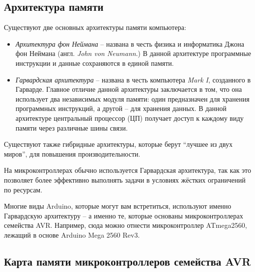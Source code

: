 \documentclass[../sparc.tex]{subfiles}
\begin{document}
\subsection{Архитектура памяти}

Существуют две основных архитектуры памяти компьютера:
\begin{itemize}
\item \emph{Архитектура фон Неймана} -- названа в честь физика и информатика
  Джона фон Неймана (англ. \textit{John von Neumann}.)  В данной архитектуре
  программные инструкции и данные сохраняются в единой памяти.
\item \emph{Гарвардская архитектура} -- названа в честь компьютера \emph{Mark I},
  созданного в Гарварде.  Главное отличие данной архитектуры заключается в том,
  что она использует два независимых модуля памяти: один предназначен для
  хранения программных инструкций, а другой -- для хранения данных.  В данной
  архитектуре центральный процессор (ЦП) получает доступ к каждому виду памяти
  через различные шины связи.
\end{itemize}

Существуют также гибридные архитектуры, которые берут ``лучшее из двух миров'',
для повышения производительности.

На микроконтроллерах обычно используется Гарвардская архитектура, так как это
позволяет более эффективно выполнять задачи в условиях жёстких ограничений по
ресурсам.

Многие виды Arduino, которые могут вам встретиться, используют именно
Гарвардскую архитектуру -- а именно те, которые основаны микроконтроллерах
семейства AVR.  Например, сюда можно отнести микроконтроллер ATmega2560, лежащий
в основе Arduino Mega 2560 Rev3.\cite{arduino:memory-guide}

\subsection{Карта памяти микроконтроллеров семейства AVR}


\end{document}
